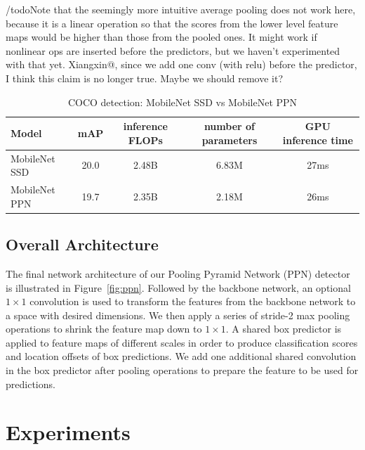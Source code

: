 \documentclass[10pt,twocolumn,letterpaper]{article}
\begin{document}
/todo{Note that the seemingly more intuitive average pooling does
not work here, because it is a linear operation so that the
scores from the lower level feature maps would be higher than
those from the pooled ones. It might work if nonlinear ops
are inserted before the predictors, but we haven't
experimented with that yet.
Xiangxin@, since we add one conv (with relu) before the predictor,
I think this claim is no longer true. Maybe we should remove it?
}


\begin{table}[t]
\begin{center}
\begin{tabular}{l|c|c|c|c}
Model & mAP & inference FLOPs & number of parameters & GPU inference time\\
\hline
\hline
MobileNet SSD & 20.0 & 2.48B & 6.83M & 27ms \\
\hline
MobileNet PPN & 19.7 & 2.35B & 2.18M & 26ms \\
\end{tabular}
\end{center}
\caption{COCO detection: MobileNet SSD vs MobileNet PPN}
\label{comparison}
\end{table}



\subsection{Overall Architecture}


The final network architecture of our Pooling Pyramid
Network (PPN) detector is illustrated in
Figure~\ref{fig:ppn}.  Followed by the backbone network, an
optional $1\times 1$ convolution is used to transform the features
from the backbone network to a space with desired
dimensions.  We then apply a series of stride-2 max pooling
operations to shrink the feature map down to $1\times 1$.  A shared
box predictor is applied to feature maps of different scales
in order to produce classification scores and location
offsets of box predictions.  We add one additional shared
convolution in the box predictor after pooling operations to
prepare the feature to be used for predictions.


\section{Experiments}
\end{document}

